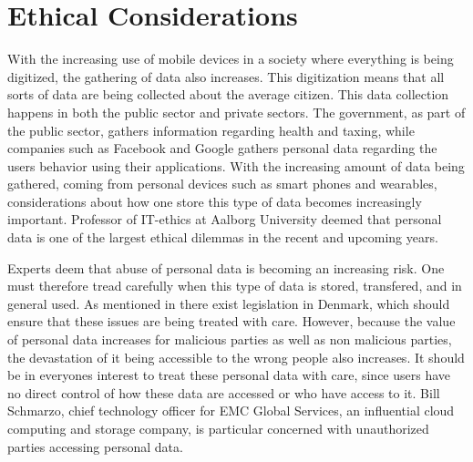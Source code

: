 
\section{Ethical Considerations}
\label{sec:ethical_considerations}

With the increasing use of mobile devices in a society where everything is being digitized, the gathering of data also increases. This digitization means that all sorts of data are being collected about the average citizen. This data collection happens in both the public sector and private sectors. The government, as part of the public sector, gathers information regarding health and taxing, while companies such as Facebook and Google gathers personal data regarding the users behavior using their applications. With the increasing amount of data being gathered, coming from personal devices such as smart phones and wearables, considerations about how one store this type of data becomes increasingly important. Professor of IT-ethics at Aalborg University deemed that personal data is one of the largest ethical dilemmas in the recent and upcoming years.


Experts deem that abuse of personal data is becoming an increasing risk. One must therefore tread carefully when this type of data is stored, transfered, and in general used. As mentioned in  there exist legislation in Denmark, which should ensure that these issues are being treated with care. However, because the value of personal data increases for malicious parties as well as non malicious parties, the devastation of it being accessible to the wrong people also increases. It should be in everyones interest to treat these personal data with care, since users have no direct control of how these data are accessed or who have access to it. Bill Schmarzo, chief technology officer for EMC Global Services, an influential cloud computing and storage company, is particular concerned with unauthorized parties accessing personal data.

